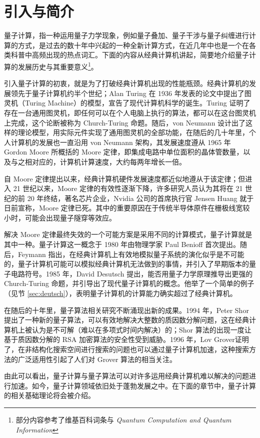 \section{引入与简介}

量子计算，指一种运用量子力学现象，例如量子叠加、量子干涉与量子纠缠进行计算的方式，是过去的数十年中兴起的一种全新计算方式，在近几年中也是一个在各类科普中高频出现的热点词汇。下面的内容从经典计算机讲起，简要地介绍量子计算的发展历史与其重要意义\footnote{部分内容参考了维基百科词条与 \textit{Quantum Computation and Quantum Information}\cite{nielsen2002quantum}}。

引入量子计算的初衷，就是为了打破经典计算机出现的性能瓶颈。经典计算机的发展领先于量子计算机约半个世纪；Alan Turing 在 1936 年发表的论文中提出了图灵机（Turing Machine）的模型\cite{turing1936computable}，宣告了现代计算机科学的诞生。Turing 证明了存在一台通用图灵机，即任何可以在个人电脑上执行的算法，都可以在这台图灵机上完成，这个论断被称为 Church-Turing 命题。随后，von Neumann 设计出了这样的理论模型，用实际元件实现了通用图灵机的全部功能，在随后的几十年里，个人计算机的发展也一直沿用 von Neumann 架构，其发展速度遵从 1965 年 Gordon Moore 所概括的 Moore 定律，即集成电路中单位面积的晶体管数量，以及与之相对应的，计算机计算速度，大约每两年增长一倍\cite{moore1965cramming}。

自 Moore 定律提出以来，经典计算机硬件发展速度都近似地遵从于该定律；但进入 21 世纪以来，Moore 定律的有效性逐渐下降，许多研究人员认为其将在 21 世纪的前 20 年终结，著名芯片企业，Nvidia 公司的首席执行官 Jensen Huang 就于日前宣称，Moore 定律已死\cite{moorelawdead}。其中的重要原因在于传统半导体原件在栅极线宽较小时，可能会出现量子隧穿等效应\cite{kumar2015fundamental}。

解决 Moore 定律最终失效的一个可能方案是采用不同的计算模式，量子计算就是其中一种。量子计算这一概念于 1980 年由物理学家 Paul Benioff 首次提出\cite{benioff1980computer}。随后，Feymann 指出，在经典计算机上有效地模拟量子系统的演化似乎是不可能的，量子计算机可能可以模拟经典计算机无法做到的事情\cite{feynman1981simulating}，并引入了早期版本的量子电路符号\cite{feynman1986quantum}。1985 年，David Desutsch 提出，能否用量子力学原理推导出更强的 Church-Turing 命题，并引导出了现代量子计算机的概念\cite{deutsch1985quantum}。他举了一个简单的例子（见节 \ref{sec:deutsch}），表明量子计算机的计算能力确实超过了经典计算机。

在随后的十年里，量子算法相关研究不断涌现出新的成果。1994 年，Peter Shor 提出了一种新的量子算法，可以有效地解决大整数的质因数分解问题\cite{shor1994algorithms}，这在经典计算机上被认为是不可解（难以在多项式时间内解决）的；Shor 算法的出现一度让基于质因数分解的 RSA 加密算法的安全性受到威胁\cite{mermin2006breaking}。1996 年，Lov Grover证明了，在非结构化搜索空间进行搜索的问题也可以通过量子计算机加速\cite{grover1996fast}，这种搜索方法的广泛适用性引起了人们对 Grover 算法的相当关注。

由此可以看出，量子计算与量子算法可以对许多运用经典计算机难以解决的问题进行加速。如今，量子计算领域依旧处于蓬勃发展之中。在下面的章节中，量子计算的相关基础理论将会被介绍。